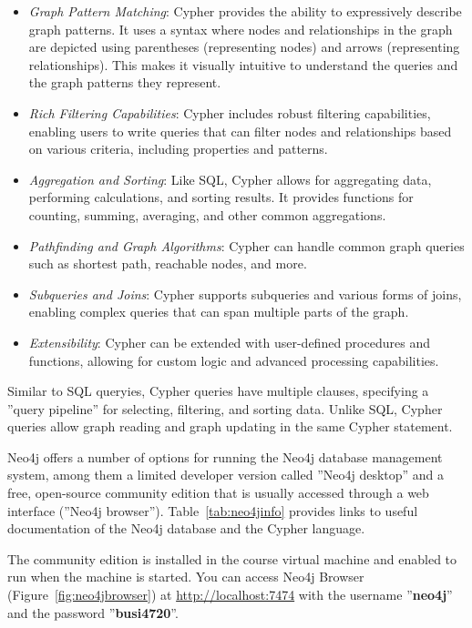 \begin{itemize}
\item \emph{Graph Pattern Matching}: Cypher provides the ability to expressively describe graph patterns. It uses a syntax where nodes and relationships in the graph are depicted using parentheses (representing nodes) and arrows (representing relationships). This makes it visually intuitive to understand the queries and the graph patterns they represent.

\item \emph{Rich Filtering Capabilities}: Cypher includes robust filtering capabilities, enabling users to write queries that can filter nodes and relationships based on various criteria, including properties and patterns.

\item \emph{Aggregation and Sorting}: Like SQL, Cypher allows for aggregating data, performing calculations, and sorting results. It provides functions for counting, summing, averaging, and other common aggregations.

\item \emph{Pathfinding and Graph Algorithms}: Cypher can handle common graph queries such as shortest path, reachable nodes, and more.

\item \emph{Subqueries and Joins}: Cypher supports subqueries and various forms of joins, enabling complex queries that can span multiple parts of the graph.

\item \emph{Extensibility}: Cypher can be extended with user-defined procedures and functions, allowing for custom logic and advanced processing capabilities.
\end{itemize}

Similar to SQL queryies, Cypher queries have multiple clauses, specifying a ''query pipeline'' for selecting, filtering, and sorting data. Unlike SQL, Cypher queries allow graph reading and graph updating in the same Cypher statement. 

Neo4j offers a number of options for running the Neo4j database management system, among them a limited developer version called ''Neo4j desktop'' and a free, open-source community edition that is usually accessed through a web interface (''Neo4j browser''). Table~\ref{tab:neo4jinfo} provides links to useful documentation of the Neo4j database and the Cypher language.

\begin{tcolorbox}[colback=alert]
The community edition is installed in the course virtual machine and enabled to run when the machine is started. You can access Neo4j Browser (Figure~\ref{fig:neo4jbrowser}) at \url{http://localhost:7474} with the username ''\textbf{neo4j}'' and the password ''\textbf{busi4720}''. 
\end{tcolorbox}

